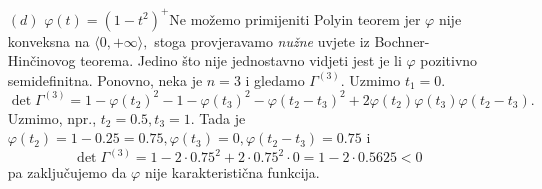 \documentclass{article}
\begin{document}
\begin{enumerate}
    \item[\((d)\)] \(\varphi(t)=(1-t^2)^+\)\newline Ne možemo primijeniti Polyin teorem jer \(\varphi\) nije konveksna na \(\langle0,+\infty\rangle,\) stoga provjeravamo \emph{nužne} uvjete iz Bochner-Hinčinovog teorema. Jedino što nije jednostavno vidjeti jest je li \(\varphi\) pozitivno semidefinitna. Ponovno, neka je \(n=3\) i gledamo \(\Gamma^{(3)}.\) Uzmimo \(t_1=0.\) \[\det\Gamma^{(3)}=1-\varphi(t_2)^2-1-\varphi(t_3)^2-\varphi(t_2-t_3)^2+2\varphi(t_2)\varphi(t_3)\varphi(t_2-t_3).\] Uzmimo, npr., \(t_2=0.5,t_3=1.\) Tada je \(\varphi(t_2)=1-0.25=0.75,\varphi(t_3)=0,\varphi(t_2-t_3)=0.75\) i \[\det\Gamma^{(3)}=1-2\cdot0.75^2+2\cdot0.75^2\cdot0=1-2\cdot0.5625<0\] pa zaključujemo da \(\varphi\) nije karakteristična funkcija.  
\end{enumerate}
\newpage
\end{document}
